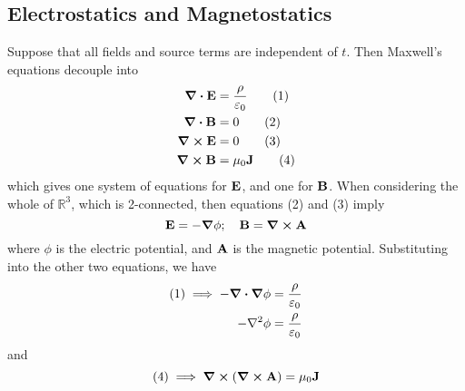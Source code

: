 \subsection{Electrostatics and Magnetostatics}
Suppose that all fields and source terms are independent of \(t\). Then Maxwell's equations decouple into
\begin{align}
	\div{\vb E}  & = \frac{\rho}{\varepsilon_0} \tag{1} \\
	\div{\vb B}  & = 0                          \tag{2} \\
	\curl{\vb E} & = 0                          \tag{3} \\
	\curl{\vb B} & = \mu_0 \vb J \tag{4}
\end{align}
which gives one system of equations for \(\vb E\), and one for \(\vb B\). When considering the whole of \(\mathbb R^3\), which is 2-connected, then equations (2) and (3) imply
\[ \vb E = -\grad \phi;\quad \vb B = \curl \vb A \]
where \(\phi\) is the electric potential, and \(\vb A\) is the magnetic potential. Substituting into the other two equations, we have
\begin{align*}
	(1) \implies -\div{\grad \phi} & = \frac{\rho}{\varepsilon_0} \\
	-\laplacian \phi               & = \frac{\rho}{\varepsilon_0}
\end{align*}
and
\[ (4) \implies \curl(\curl{\vb A}) = \mu_0 \vb J \]
